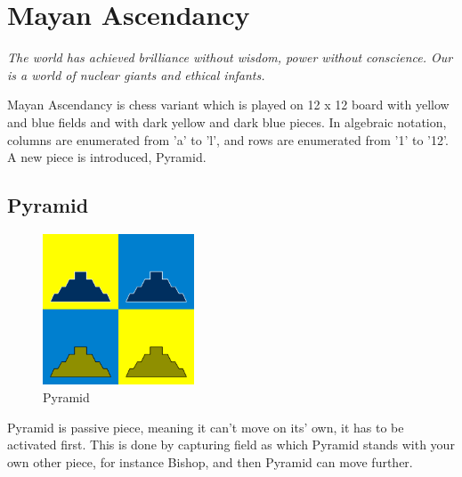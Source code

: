 \documentclass[a5paper,12pt,draft]{book} %
\begin{document}
\clearpage

\chapter*{Mayan Ascendancy}

\begin{flushright}
\parbox{0.8\textwidth}{
\emph{The world has achieved brilliance without wisdom, power without
conscience. Our is a world of nuclear giants and ethical infants. \\
 } }
\end{flushright}

Mayan Ascendancy is chess variant which is played on 12 x 12 board with
yellow and blue fields and with dark yellow and dark blue pieces. In
algebraic notation, columns are enumerated from 'a' to 'l', and rows are
enumerated from '1' to '12'. A new piece is introduced, Pyramid.

\clearpage

\section*{Pyramid}

\noindent
\begin{figure}
\includegraphics[width=0.4\textwidth, keepaspectratio=true]{../gfx/pieces/08_pyramid.png}
\caption{Pyramid}
\label{fig:pyramid}
\end{figure}
\indent
Pyramid is passive piece, meaning it can't move on its' own, it has to be
activated first. This is done by capturing field as which Pyramid stands
with your own other piece, for instance Bishop, and then Pyramid can move
further.
\end{document}
